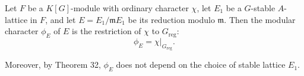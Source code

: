 Let $F$ be a $K[G]$-module with ordinary character $\chi$, let $E_1$ be a $G$-stable $A$-lattice in $F$, and let $E = E_1/\mathfrak{m}E_1$ be its reduction modulo $\mathfrak{m}$. Then the modular character $\phi_E$ of $E$ is the restriction of $\chi$ to $G_{\text{reg}}$:
$$\phi_E = \chi|_{G_{\text{reg}}}.$$

Moreover, by Theorem 32, $\phi_E$ does not depend on the choice of stable lattice $E_1$.
